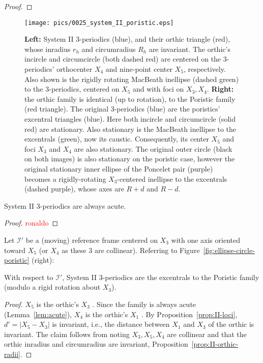 \begin{proof}

\end{proof}

\begin{figure}
    \centering
    \texttt{[image: pics/0025\_system\_II\_poristic.eps]}
    \caption{\textbf{Left:} System II 3-periodics (blue), and their orthic triangle (red), whose inradius $r_h$ and circumradius $R_h$ are invariant. The orthic's incircle and circumcircle (both dashed red) are centered on the 3-periodics' orthocenter $X_4$ and nine-point center $X_5$, respectively. Also shown is the rigidly rotating MacBeath inellipse (dashed green) to the 3-periodics, centered on $X_5$ and with foci on $X_3,X_4$. \textbf{Right:} the orthic family is identical (up to rotation), to the Poristic family (red triangle). The original 3-periodics (blue) are the poristics' excentral triangles (blue). Here both incircle and circumcircle (solid red) are stationary. Also stationary is the MacBeath inellipse to the excentrals (green), now its caustic. Consequently, its center $X_5$ and foci $X_3$ and $X_4$ are also stationary. The original outer circle (black on both images) is also stationary on the poristic case, however the original stationary inner ellipse of the Poncelet pair (purple) becomes a rigidly-rotating $X_3$-centered inellipse to the excentrals (dashed purple), whose axes are $R+d$ and $R-d$.}
    \label{fig:II-poristic}
\end{figure}

\begin{lemma}
System II 3-periodics are always acute.
\label{lem:acute}
\end{lemma}

\begin{proof}
\textcolor{red}{ronaldo}
\end{proof}

Let $\mathcal{I}'$ be a (moving) reference frame centered on $X_3$ with one axis oriented toward $X_5$ (or $X_4$ as these 3 are collinear). Referring to Figure~\ref{fig:ellipse-circle-poristic} (right):

\begin{proposition}
With respect to $\mathcal{I}'$, System II 3-periodics are the excentrals to the Poristic family (modulo a rigid rotation about $X_3$).
\end{proposition}

\begin{proof}
$X_5$ is the orthic's $X_3$ \cite{etc}. Since the family is always acute (Lemma~\ref{lem:acute}), $X_4$ is the orthic's $X_1$ \cite{coxeter67}. By  Proposition~\ref{prop:II-loci}, $d'=|X_5-X_3|$ is invariant, i.e., the distance between $X_1$ and $X_3$ of the orthic is invariant. The claim follows from noting $X_3,X_5,X_4$ are collinear \cite{mw} and that the orthic inradius and
circumradius are invariant, Proposition~\ref{prop:II-orthic-radii}. 
\end{proof}

